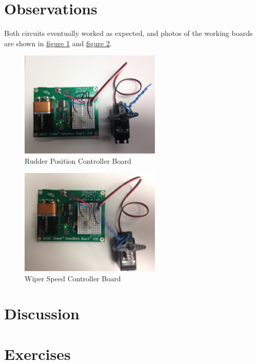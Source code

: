 \documentclass[11pt]{article}
\begin{document}
\section{Observations}

Both circuits eventually worked as expected, and photos of the working boards are shown in
\hyperref[rudder-controller]{figure \ref{rudder-controller}}
and \hyperref[wiper-controller]{figure \ref{wiper-controller}}.

\begin{figure}
\centering
\includegraphics[width=0.6\textwidth]{rudder-controller.jpg}
\caption{Rudder Position Controller Board}
\label{rudder-controller}
\end{figure}

\begin{figure}
\centering
\includegraphics[width=0.6\textwidth]{wiper-controller.jpg}
\caption{Wiper Speed Controller Board}
\label{wiper-controller}
\end{figure}

\section{Discussion}

\section{Exercises}
\end{document}
